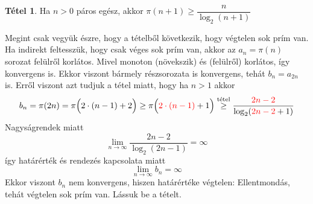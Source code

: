 \documentclass[12pt]{book}
\theoremstyle{plain} %
\theoremstyle{definition} %
\newtheorem{theo/}{Tétel}[section]
\newenvironment{theo}
  {\renewcommand{\qedsymbol}{$\clubsuit$}%
   \pushQED{\qed}\begin{theo/}}
  {\popQED\end{theo/}}
\theoremstyle{remark}
\renewcommand\qedsymbol{$\blacksquare$}
\numberwithin{equation}{section}  %
\begin{document}
	\begin{theo}
		Ha $n>0$ páros egész, akkor $\pi(n+1) \geq \dfrac{n}{\log_2 (n+1)}$
	\end{theo}

	Megint csak vegyük észre, hogy a tételből következik, hogy végtelen sok prím van. Ha indirekt feltesszük, hogy csak véges sok prím van, akkor az $a_n = \pi(n)$ sorozat felülről korlátos. Mivel monoton (növekszik) és (felülről) korlátos, így konvergens is. Ekkor viszont bármely részsorozata is konvergens, tehát $b_n = a_{2n}$ is. Erről viszont azt tudjuk a tétel miatt, hogy ha $n>1$ akkor
	\[ b_n = \pi(2n) = \pi\Big(2\cdot (n-1) + 2\Big) \geq \pi\Big(\color{red}2 \cdot (n-1)\color{black} + 1\Big) \stackrel{\text{tétel}}{\geq} \dfrac{\color{red}2n-2\color{black}}{\log_2 (\color{red}2n-2\color{black} + 1)}  \]
	Nagyságrendek miatt
	\[ \lim\limits_{n\to \infty} \dfrac{2n-2}{\log_2 (2n-1)} = \infty  \]
	így határérték és rendezés kapcsolata miatt
	\[ \lim\limits_{n\to \infty} b_n = \infty  \]
	Ekkor viszont $b_n$ nem konvergens, hiszen határértéke végtelen: Ellentmondás, tehát végtelen sok prím van. Lássuk be a tételt.
	
\end{document}
